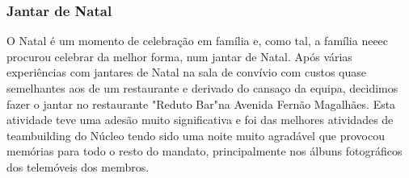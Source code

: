 
\subsubsection{Jantar de Natal}

O Natal é um momento de celebração em família e, como tal, a família \acrshort{neeec} procurou celebrar da melhor forma, num jantar de Natal. Após várias experiências com jantares de Natal na sala de convívio com custos quase semelhantes aos de um restaurante e derivado do cansaço da equipa, decidimos fazer o jantar no restaurante "Reduto Bar"\space na Avenida Fernão Magalhães. Esta atividade teve uma adesão muito significativa e foi das melhores atividades de teambuilding do Núcleo tendo sido uma noite muito agradável que provocou memórias para todo o resto do mandato, principalmente nos álbuns fotográficos dos telemóveis dos membros.